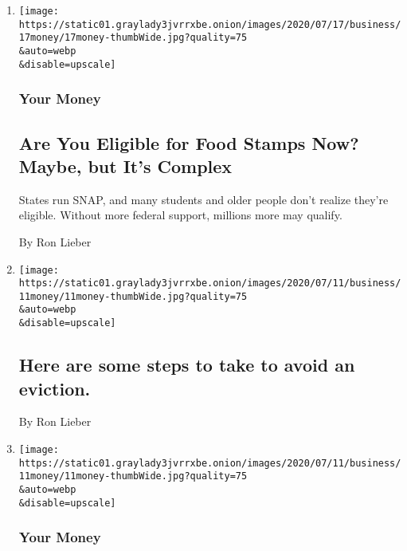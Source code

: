\begin{enumerate}
\def\labelenumi{\arabic{enumi}.}
\item
  \href{/2020/07/17/your-money/food-stamps-coronavirus.html}{}

  \texttt{[image: https://static01.graylady3jvrrxbe.onion/images/2020/07/17/business/17money/17money-thumbWide.jpg?quality=75\\\&auto=webp\\\&disable=upscale]}

  \hypertarget{your-money}{%
  \subsubsection{Your Money}\label{your-money}}

  \hypertarget{are-you-eligible-for-food-stamps-now-maybe-but-its-complex}{%
  \subsection{Are You Eligible for Food Stamps Now? Maybe, but It's
  Complex}\label{are-you-eligible-for-food-stamps-now-maybe-but-its-complex}}

  States run SNAP, and many students and older people don't realize
  they're eligible. Without more federal support, millions more may
  qualify.

  By Ron Lieber
\item
  \href{/live/2020/07/13/business/stock-market-today-coronavirus/here-are-some-steps-to-take-to-avoid-an-eviction}{}

  \texttt{[image: https://static01.graylady3jvrrxbe.onion/images/2020/07/11/business/11money/11money-thumbWide.jpg?quality=75\\\&auto=webp\\\&disable=upscale]}

  \hypertarget{here-are-some-steps-to-take-to-avoid-an-eviction}{%
  \subsection{Here are some steps to take to avoid an
  eviction.}\label{here-are-some-steps-to-take-to-avoid-an-eviction}}

  By Ron Lieber
\item
  \href{/2020/07/11/your-money/coronavirus-eviction-prevention-renters-landlord.html}{}

  \texttt{[image: https://static01.graylady3jvrrxbe.onion/images/2020/07/11/business/11money/11money-thumbWide.jpg?quality=75\\\&auto=webp\\\&disable=upscale]}

  \hypertarget{your-money-1}{%
  \subsubsection{Your Money}\label{your-money-1}}


\end{enumerate}

